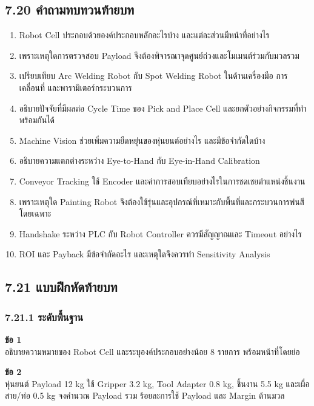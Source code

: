 \subsection{7.20 คำถามทบทวนท้ายบท}

\begin{enumerate}
    \item Robot Cell ประกอบด้วยองค์ประกอบหลักอะไรบ้าง และแต่ละส่วนมีหน้าที่อย่างไร
    \item เพราะเหตุใดการตรวจสอบ Payload จึงต้องพิจารณาจุดศูนย์ถ่วงและโมเมนต์ร่วมกับมวลรวม
    \item เปรียบเทียบ Arc Welding Robot กับ Spot Welding Robot ในด้านเครื่องมือ การเคลื่อนที่ และพารามิเตอร์กระบวนการ
    \item อธิบายปัจจัยที่มีผลต่อ Cycle Time ของ Pick and Place Cell และยกตัวอย่างกิจกรรมที่ทำพร้อมกันได้
    \item Machine Vision ช่วยเพิ่มความยืดหยุ่นของหุ่นยนต์อย่างไร และมีข้อจำกัดใดบ้าง
    \item อธิบายความแตกต่างระหว่าง Eye-to-Hand กับ Eye-in-Hand Calibration
    \item Conveyor Tracking ใช้ Encoder และค่าการสอบเทียบอย่างไรในการชดเชยตำแหน่งชิ้นงาน
    \item เพราะเหตุใด Painting Robot จึงต้องใช้รุ่นและอุปกรณ์ที่เหมาะกับพื้นที่และกระบวนการพ่นสีโดยเฉพาะ
    \item Handshake ระหว่าง PLC กับ Robot Controller ควรมีสัญญาณและ Timeout อย่างไร
    \item ROI และ Payback มีข้อจำกัดอะไร และเหตุใดจึงควรทำ Sensitivity Analysis
\end{enumerate}



\subsection{7.21 แบบฝึกหัดท้ายบท}

\subsubsection{7.21.1 ระดับพื้นฐาน}

\textbf{ข้อ 1}\\
อธิบายความหมายของ Robot Cell และระบุองค์ประกอบอย่างน้อย 8 รายการ พร้อมหน้าที่โดยย่อ

\textbf{ข้อ 2}\\
หุ่นยนต์ Payload 12 kg ใช้ Gripper 3.2 kg, Tool Adapter 0.8 kg, ชิ้นงาน 5.5 kg และเผื่อสาย/ท่อ 0.5 kg จงคำนวณ Payload รวม ร้อยละการใช้ Payload และ Margin ด้านมวล

